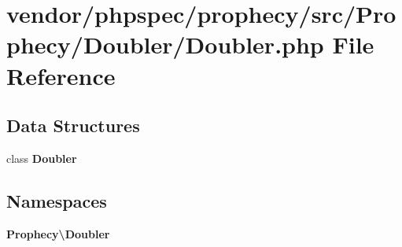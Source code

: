 \section{vendor/phpspec/prophecy/src/\+Prophecy/\+Doubler/\+Doubler.php File Reference}
\label{_doubler_8php}
\subsection*{Data Structures}
\begin{DoxyCompactItemize}
\item 
class {\bf Doubler}
\end{DoxyCompactItemize}
\subsection*{Namespaces}
\begin{DoxyCompactItemize}
\item 
 {\bf Prophecy\textbackslash{}\+Doubler}
\end{DoxyCompactItemize}
